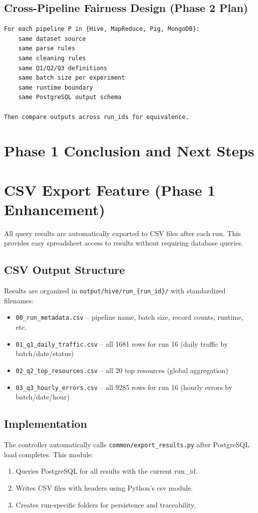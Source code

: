 \documentclass[12pt,a4paper]{article}
\begin{document}
\subsection{Cross-Pipeline Fairness Design (Phase 2 Plan)}
\begin{verbatim}
For each pipeline P in {Hive, MapReduce, Pig, MongoDB}:
    same dataset source
    same parse rules
    same cleaning rules
    same Q1/Q2/Q3 definitions
    same batch size per experiment
    same runtime boundary
    same PostgreSQL output schema

Then compare outputs across run_ids for equivalence.
\end{verbatim}

\section{Phase 1 Conclusion and Next Steps}
\section{CSV Export Feature (Phase 1 Enhancement)}
All query results are automatically exported to CSV files after each run. This provides easy spreadsheet access to results without requiring database queries.

\subsection{CSV Output Structure}
Results are organized in \texttt{output/hive/run\_\{run\_id\}/} with standardized filenames:
\begin{itemize}
    \item \texttt{00\_run\_metadata.csv} -- pipeline name, batch size, record counts, runtime, etc.
    \item \texttt{01\_q1\_daily\_traffic.csv} -- all 1681 rows for run 16 (daily traffic by batch/date/status)
    \item \texttt{02\_q2\_top\_resources.csv} -- all 20 top resources (global aggregation)
    \item \texttt{03\_q3\_hourly\_errors.csv} -- all 9285 rows for run 16 (hourly errors by batch/date/hour)
\end{itemize}

\subsection{Implementation}
The controller automatically calls \texttt{common/export\_results.py} after PostgreSQL load completes. This module:
\begin{enumerate}
    \item Queries PostgreSQL for all results with the current run\_id.
    \item Writes CSV files with headers using Python's csv module.
    \item Creates run-specific folders for persistence and traceability.
\end{enumerate}
\end{document}
